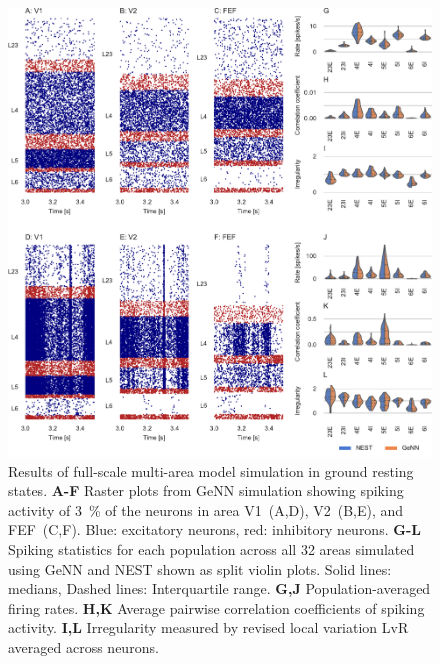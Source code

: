 \documentclass[9pt,a4paper]{amsart}
\newenvironment{fullwidth}{%
  \begin{adjustwidth}{-0.85in}{-0.85in}
}{\end{adjustwidth}}
\begin{document}
\begin{figure}
    \begin{fullwidth}
        \centering
        \includegraphics{figures/multi_area}
        \captionsetup{width=6.69in}
        \caption{Results of full-scale multi-area model simulation in ground resting states. 
        \textbf{A-F} Raster plots from GeNN simulation showing spiking activity of \SI{3}{\percent} of the neurons in area V1~(A,D), V2~(B,E), and FEF~(C,F).
        Blue: excitatory neurons, red: inhibitory neurons.
        \textbf{G-L} Spiking statistics for each population across all 32 areas simulated using GeNN and NEST shown as split violin plots.
        Solid lines: medians, Dashed lines: Interquartile range.
        \textbf{G,J} Population-averaged firing rates.
        \textbf{H,K} Average pairwise correlation coefficients of spiking activity. 
        \textbf{I,L} Irregularity measured by revised local variation LvR~\citep{Shinomoto2009} averaged across neurons.}
        \label{fig:multi_area}
    \end{fullwidth}
\end{figure}
%
\end{document}
